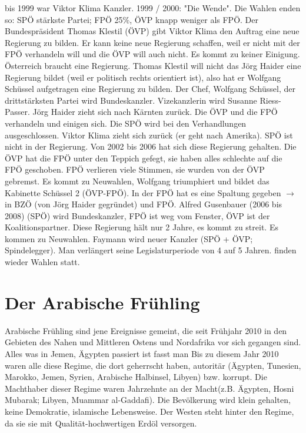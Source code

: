 \documentclass[a4paper,final]{report}
\begin{document}
\newline
{} bis 1999 war Viktor Klima Kanzler. 1999 / 2000: "Die Wende". Die Wahlen enden so: SPÖ stärkste Partei; FPÖ 25\%, ÖVP knapp weniger als FPÖ.
Der Bundespräsident Thomas Klestil (ÖVP) gibt Viktor Klima den Auftrag eine neue Regierung zu bilden. Er kann keine neue Regierung schaffen, weil er nicht mit der FPÖ verhandeln will und die ÖVP will auch nicht. Es kommt zu keiner Einigung.
\newline
\newline
Österreich braucht eine Regierung. Thomas Klestil will nicht das Jörg Haider eine Regierung bildet (weil er politisch rechts orientiert ist), also hat er Wolfgang Schüssel aufgetragen eine Regierung zu bilden. Der Chef, Wolfgang Schüssel, der drittstärksten Partei wird Bundeskanzler. Vizekanzlerin wird Susanne Riess-Passer. Jörg Haider zieht sich nach Kärnten zurück. 
\newline
\newline
Die ÖVP und die FPÖ verhandeln und einigen sich. Die SPÖ wird bei den Verhandlungen ausgeschlossen. Viktor Klima zieht sich zurück (er geht nach Amerika). SPÖ ist nicht in der Regierung.
\newline
\newline
Von 2002 bis 2006 hat sich diese Regierung gehalten. Die ÖVP hat die FPÖ unter den Teppich gefegt, sie haben alles schlechte auf die FPÖ geschoben. FPÖ verlieren viele Stimmen, sie wurden von der ÖVP gebremst. Es kommt zu Neuwahlen, Wolfgang triumphiert und bildet das Kabinette Schüssel 2 (ÖVP-FPÖ). In der FPÖ hat es eine Spaltung gegeben $\rightarrow$ in BZÖ (von Jörg Haider gegründet) und FPÖ.
\newline
\newline
Alfred Gusenbauer (2006 bis 2008) (SPÖ) wird Bundeskanzler, FPÖ ist weg vom Fenster, ÖVP ist der Koalitionspartner. 
Diese Regierung hält nur 2 Jahre, es kommt zu streit. Es kommen zu Neuwahlen. Faymann wird neuer Kanzler (SPÖ + ÖVP; Spindelegger). Man verlängert seine Legislaturperiode von 4 auf 5 Jahren.
 finden wieder Wahlen statt.

\section{Der Arabische Frühling}

Arabische Frühling sind jene Ereignisse gemeint, die seit Frühjahr 2010 in den Gebieten des Nahen und Mittleren Ostens und Nordafrika vor sich gegangen sind. Alles was in Jemen, Ägypten passiert ist fasst man 
\newline
\newline
Bis zu diesem Jahr 2010 waren alle diese Regime, die dort geherrscht haben, autoritär (Ägypten, Tunesien, Marokko, Jemen, Syrien, Arabische Halbinsel, Libyen) bzw. korrupt. Die Machthaber dieser Regime waren Jahrzehnte an der Macht(z.B. Ägypten, Hosni Mubarak; Libyen, Muammar al-Gaddafi). Die Bevölkerung wird klein gehalten, keine Demokratie, islamische Lebensweise. Der Westen steht hinter den Regime, da sie sie mit Qualität-hochwertigen Erdöl versorgen.
\end{document}
